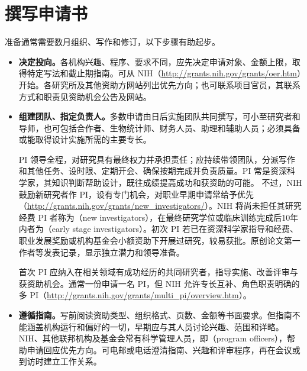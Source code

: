 \section{撰写申请书}
准备通常需要数月组织、写作和修订，以下步骤有助起步。
\begin{itemize}
\item \textbf{决定投向。}各机构兴趣、程序、要求不同，应先决定申请对象、金额上限，取得特定写法和截止期指南。可从 NIH（\url{http://grants.nih.gov/grants/oer.htm}）开始。各研究所及其他资助方网站列出优先方向；也可联系项目官员，其联系方式和职责见资助机会公告及网站。
\item \textbf{组建团队、指定负责人。}多数申请由日后实施团队共同撰写，可小至研究者和导师，也可包括合作者、生物统计师、财务人员、助理和辅助人员；必须具备或能取得设计实施所需的主要专长。

PI 领导全程，对研究具有最终权力并承担责任；应持续带领团队，分派写作和其他任务、设时限、定期开会、确保按期完成并负责质量。PI 常是资深科学家，其知识判断帮助设计，既往成绩提高成功和获资助的可能。
不过，NIH 鼓励新研究者作 PI，设有专门机会，对职业早期申请常给予优先（\url{http://grants.nih.gov/grants/new_investigators/}）。NIH 将尚未担任其研究经费 PI 者称为（new investigators），在最终研究学位或临床训练完成后10年内者为（early stage investigators）。初次 PI 若已在资深科学家指导和经费、职业发展奖励或机构基金会小额资助下开展过研究，较易获批。原创论文第一作者等发表记录，显示独立潜力和领导准备。

首次 PI 应纳入在相关领域有成功经历的共同研究者，指导实施、改善评审与获资助机会。通常一份申请一名 PI，但 NIH 允许专长互补、角色职责明确的多 PI（\url{http://grants.nih.gov/grants/multi_pi/overview.htm}）。
\item \textbf{遵循指南。}写前阅读资助类型、组织格式、页数、金额等书面要求。但指南不能涵盖机构运行和偏好的一切，早期应与其人员讨论兴趣、范围和详略。
NIH、其他联邦机构及基金会常有科学管理人员，即（program officers），帮助申请回应优先方向。可电邮或电话澄清指南、兴趣和评审程序，再在会议或到访时建立工作关系。


\end{itemize}
